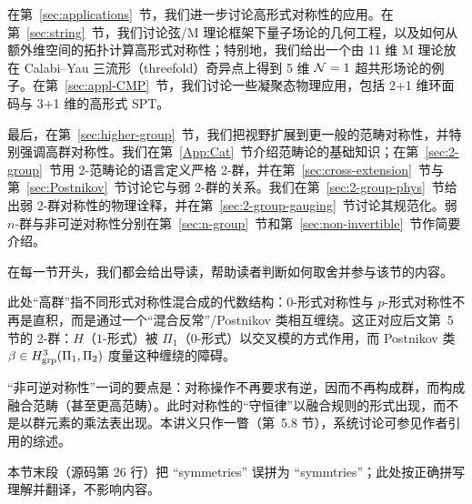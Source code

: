 在第~\ref{sec:applications}~节，我们进一步讨论高形式对称性的应用。在第~\ref{sec:string}~节，我们讨论弦/M 理论框架下量子场论的几何工程，以及如何从额外维空间的拓扑计算高形式对称性；特别地，我们给出一个由 11 维 M 理论放在 Calabi–Yau 三流形（threefold）奇异点上得到 5 维 $\mathcal{N}=1$ 超共形场论的例子。在第~\ref{sec:appl-CMP}~节，我们讨论一些凝聚态物理应用，包括 2+1 维环面码与 3+1 维的高形式 SPT。

最后，在第~\ref{sec:higher-group}~节，我们把视野扩展到更一般的范畴对称性，并特别强调高群对称性。我们在第~\ref{App:Cat}~节介绍范畴论的基础知识；在第~\ref{sec:2-group}~节用 2-范畴论的语言定义严格 2-群，并在第~\ref{sec:cross-extension}~节与第~\ref{sec:Postnikov}~节讨论它与弱 2-群的关系。我们在第~\ref{sec:2-group-phys}~节给出弱 2-群对称性的物理诠释，并在第~\ref{sec:2-group-gauging}~节讨论其规范化。弱 $n$-群与非可逆对称性分别在第~\ref{sec:n-group}~节和第~\ref{sec:non-invertible}~节作简要介绍。

在每一节开头，我们都会给出导读，帮助读者判断如何取舍并参与该节的内容。

\begin{yizhu}
此处“高群”指不同形式对称性混合成的代数结构：$0$-形式对称性与 $p$-形式对称性不再是直积，而是通过一个“混合反常”/Postnikov 类相互缠绕。这正对应后文第~5 节的 2-群：$H$（$1$-形式）被 $\Pi_1$（$0$-形式）以交叉模的方式作用，而 Postnikov 类 $\beta\in H^3_{\rm grp}(\Pi_1,\Pi_2)$ 度量这种缠绕的障碍。
\end{yizhu}

\begin{yizhu}
“非可逆对称性”一词的要点是：对称操作不再要求有逆，因而不再构成群，而构成融合范畴（甚至更高范畴）。此时对称性的“守恒律”以融合规则的形式出现，而不是以群元素的乘法表出现。本讲义只作一瞥（第~5.8 节），系统讨论可参见作者引用的综述。
\end{yizhu}

\begin{yizhu}[原文疑误]
本节末段（源码第 26 行）把 “symmetries” 误拼为 “symmtries”；此处按正确拼写理解并翻译，不影响内容。
\end{yizhu}
